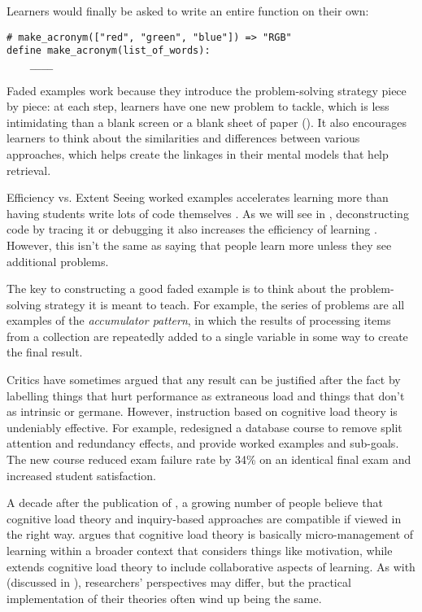 Learners would finally be asked to write an entire function on their
own:

\begin{verbatim}
# make_acronym(["red", "green", "blue"]) => "RGB"
define make_acronym(list_of_words):
    ____
\end{verbatim}

Faded examples work because they introduce the problem-solving strategy
piece by piece: at each step, learners have one new problem to tackle,
which is less intimidating than a blank screen or a blank sheet of paper
(). It also encourages learners to
think about the similarities and differences between various approaches,
which helps create the linkages in their mental models that help
retrieval.

\begin{aside}{Efficiency vs. Extent}
  Seeing worked examples accelerates learning more than having students
  write lots of code themselves \cite{Skud2014}. As we will see in
  , deconstructing code by tracing it or debugging it
  also increases the efficiency of learning \cite{Grif2016}. However,
  this isn't the same as saying that people learn more unless they see
  additional problems.
\end{aside}

The key to constructing a good faded example is to think about the
problem-solving strategy it is meant to teach. For example, the series
of problems are all examples of the \emph{accumulator pattern}, in which the
results of processing items from a collection are repeatedly added to a
single variable in some way to create the final result.

Critics have sometimes argued that any result can be justified after the
fact by labelling things that hurt performance as extraneous load and
things that don't as intrinsic or germane. However, instruction based on
cognitive load theory is undeniably effective. For example,
\cite{Maso2016} redesigned a database course to remove split
attention and redundancy effects, and provide worked examples and
sub-goals. The new course reduced exam failure rate by 34\% on an
identical final exam and increased student satisfaction.

A decade after the publication of \cite{Kirs2006}, a growing number
of people believe that cognitive load theory and inquiry-based
approaches are compatible if viewed in the right way. \cite{Kaly2015}
argues that cognitive load theory is basically micro-management of
learning within a broader context that considers things like motivation,
while \cite{Kirs2018} extends cognitive load theory to include
collaborative aspects of learning. As with \cite{Mark2018} (discussed
in ), researchers' perspectives may
differ, but the practical implementation of their theories often wind up
being the same.

